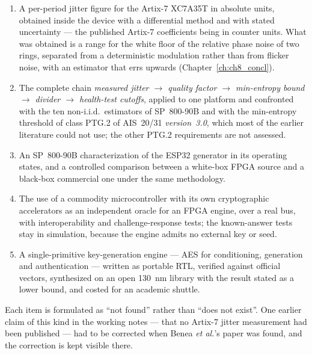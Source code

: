 \begin{enumerate}
\item A per-period jitter figure for the Artix-7 XC7A35T in absolute
units, obtained inside the device with a differential method and with
stated uncertainty --- the published Artix-7 coefficients being in
counter units. What was obtained is a range for the white floor of the
relative phase noise of two rings, separated from a deterministic
modulation rather than from flicker noise, with an estimator that errs
upwards (Chapter~\ref{ch:ch8_concl}).
\item The complete chain \emph{measured jitter $\to$ quality factor $\to$
min-entropy bound $\to$ divider $\to$ health-test cutoffs}, applied to one
platform and confronted with the ten non-i.i.d.\ estimators of SP~800-90B
and with the min-entropy threshold of class PTG.2 of AIS~20/31
\emph{version~3.0}, which most of the earlier literature could not use;
the other PTG.2 requirements are not assessed.
\item An SP~800-90B characterization of the ESP32 generator in its
operating states, and a controlled comparison between a white-box FPGA
source and a black-box commercial one under the same methodology.
\item The use of a commodity microcontroller with its own cryptographic
accelerators as an independent oracle for an FPGA engine, over a real
bus, with interoperability and challenge-response tests; the known-answer
tests stay in simulation, because the engine admits no external key or
seed.
\item A single-primitive key-generation engine --- AES for conditioning,
generation and authentication --- written as portable RTL, verified
against official vectors, synthesized on an open 130~nm library with the
result stated as a lower bound, and costed for an academic shuttle.
\end{enumerate}

Each item is formulated as ``not found'' rather than ``does not exist''.
One earlier claim of this kind in the working notes --- that no Artix-7
jitter measurement had been published --- had to be corrected when
Benea \emph{et al.}'s paper was found, and the correction is kept visible
there.
